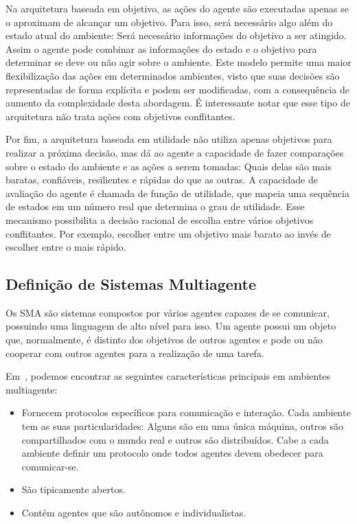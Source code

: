Na arquitetura baseada em objetivo, as ações do agente são executadas apenas se o aproximam de alcançar um objetivo. Para isso, será necessário algo além do estado atual do ambiente: Será necessário informações do objetivo a ser atingido. Assim o agente pode combinar as informações do estado e o objetivo para determinar se deve ou não agir sobre o ambiente. Este modelo permite uma maior flexibilização das ações em determinados ambientes, visto que suas decisões são representadas de forma explícita e podem ser modificadas, com a consequência de aumento da complexidade desta abordagem. É interessante notar que esse tipo de arquitetura não trata ações com objetivos conflitantes.

Por fim, a arquitetura baseada em utilidade não utiliza apenas objetivos para realizar a próxima decisão, mas dá ao agente a capacidade de fazer comparações sobre o estado do ambiente e as ações a serem tomadas: Quais delas são mais baratas, confiáveis, resilientes e rápidas do que as outras. A capacidade de avaliação do agente é chamada de função de utilidade, que mapeia uma sequência de estados em um número real que determina o grau de utilidade. Esse mecanismo possibilita a decisão racional de escolha entre vários objetivos conflitantes. Por exemplo, escolher entre um objetivo mais barato ao invés de escolher entre o mais rápido.

\subsection{Definição de Sistemas Multiagente}

Os SMA são sistemas compostos por vários agentes capazes de se comunicar, possuindo uma linguagem de alto nível para isso. Um agente possui um objeto que, normalmente, é distinto dos objetivos de outros agentes e pode ou não cooperar com outros agentes para a realização de uma tarefa.

Em~\cite{sarmento11}, podemos encontrar as seguintes características principais em ambientes multiagente:
\begin{itemize}
	\item Fornecem protocolos específicos para comunicação e interação. Cada ambiente tem as suas particularidades: Alguns são em uma única máquina, outros são compartilhados com o mundo real e outros são distribuídos. Cabe a cada ambiente definir um protocolo onde todos agentes devem obedecer para comunicar-se.
	\item São tipicamente abertos.
	\item Contém agentes que são autônomos e individualistas.
\end{itemize}

